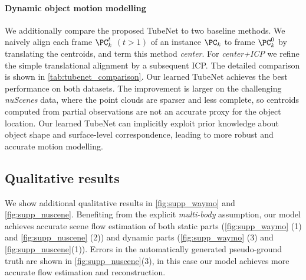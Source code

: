 \paragraph{Dynamic object motion modelling}
We additionally compare the proposed TubeNet to two baseline methods. We naively align each frame $\PC_k^t$ $(t>1)$ of an instance $\PC_k$ to frame $\PC_k^0$ by %
translating the centroids, and term this method \textit{center}. For \textit{center+ICP} we refine the simple translational alignment by a subsequent ICP. The detailed comparison is shown in \cref{tab:tubenet_comparison}. Our learned TubeNet achieves the best performance on both datasets. The improvement is larger on the challenging \emph{nuScenes} data, where the point clouds are sparser and less complete, so centroids computed from partial observations are not an accurate proxy for the object location. Our learned TubeNet can implicitly exploit prior knowledge about object shape and surface-level correspondence, leading to more robust and accurate motion modelling. 

\subsection{Qualitative results}
\label{sec:supp_qual}
We show additional qualitative results in \cref{fig:supp_waymo} and \cref{fig:supp_nuscene}. Benefiting from the explicit \textit{multi-body} assumption, our model achieves accurate scene flow estimation of both static parts (\cref{fig:supp_waymo} (1) and \cref{fig:supp_nuscene} (2)) and dynamic parts (\cref{fig:supp_waymo} (3) and \cref{fig:supp_nuscene}(1)). Errors in the automatically generated pseudo-ground truth are shown in \cref{fig:supp_nuscene}(3), in this case our model achieves more accurate flow estimation and reconstruction.  



